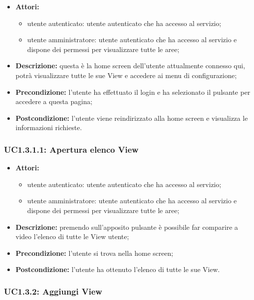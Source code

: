 \begin{itemize}
    \item \textbf{Attori:}
    \begin{itemize}
    	\item utente autenticato: utente autenticato che ha accesso al servizio;
    	\item utente amministratore: utente autenticato che ha accesso al servizio e dispone dei permessi per visualizzare tutte le aree;
	\end{itemize}
    \item \textbf{Descrizione:} questa è la home screen dell'utente attualmente connesso qui, potrà visualizzare tutte le sue View e accedere ai menu di configurazione;
    \item \textbf{Precondizione:} l'utente ha effettuato il login e ha selezionato il pulsante per accedere a questa pagina;
    \item \textbf{Postcondizione:} l'utente viene reindirizzato alla home screen e visualizza le informazioni richieste.
\end{itemize}

\subsubsection{UC1.3.1.1: Apertura elenco View}

\begin{itemize}
    \item \textbf{Attori:}
    \begin{itemize}
    	\item utente autenticato: utente autenticato che ha accesso al servizio;
    	\item utente amministratore: utente autenticato che ha accesso al servizio e dispone dei permessi per visualizzare tutte le aree;
	\end{itemize}
    \item \textbf{Descrizione:} premendo sull'apposito pulsante è possibile far comparire a video l'elenco di tutte le View utente;
    \item \textbf{Precondizione:} l'utente si trova nella home screen;
    \item \textbf{Postcondizione:} l'utente ha ottenuto l'elenco di tutte le sue View.
\end{itemize}

\subsubsection{UC1.3.2: Aggiungi View}

